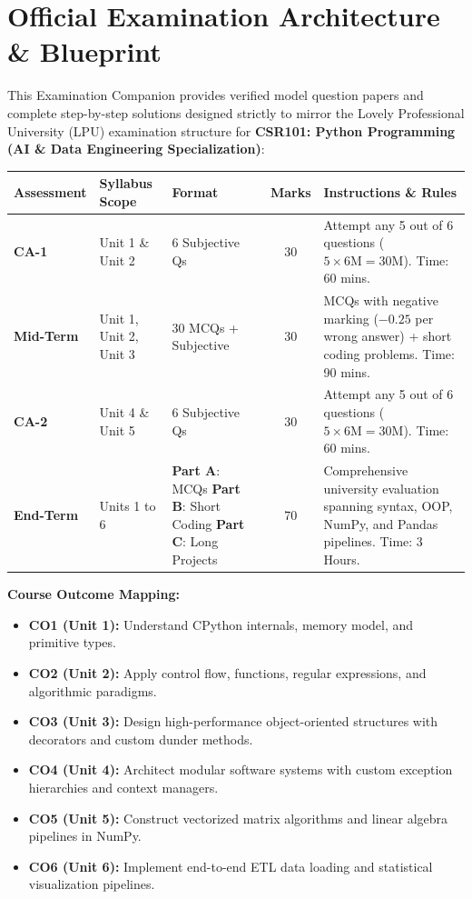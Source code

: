 \chapter*{Official Examination Architecture \& Blueprint}

This Examination Companion provides verified model question papers and complete step-by-step solutions designed strictly to mirror the Lovely Professional University (LPU) examination structure for \textbf{CSR101: Python Programming (AI \& Data Engineering Specialization)}:

\begin{center}
\begin{tabularx}{\textwidth}{l p{3.2cm} p{2.8cm} c X}
\toprule
\textbf{Assessment} & \textbf{Syllabus Scope} & \textbf{Format} & \textbf{Marks} & \textbf{Instructions \& Rules} \\
\midrule
\textbf{CA-1} & Unit 1 \& Unit 2 & 6 Subjective Qs & 30 & Attempt any 5 out of 6 questions ($5 \times 6\text{M} = 30\text{M}$). Time: 60 mins. \\
\addlinespace
\textbf{Mid-Term} & Unit 1, Unit 2, Unit 3 & 30 MCQs + Subjective & 30 & MCQs with negative marking ($-0.25$ per wrong answer) + short coding problems. Time: 90 mins. \\
\addlinespace
\textbf{CA-2} & Unit 4 \& Unit 5 & 6 Subjective Qs & 30 & Attempt any 5 out of 6 questions ($5 \times 6\text{M} = 30\text{M}$). Time: 60 mins. \\
\addlinespace
\textbf{End-Term} & Units 1 to 6 & \textbf{Part A}: MCQs \newline \textbf{Part B}: Short Coding \newline \textbf{Part C}: Long Projects & 70 & Comprehensive university evaluation spanning syntax, OOP, NumPy, and Pandas pipelines. Time: 3 Hours. \\
\bottomrule
\end{tabularx}
\end{center}

\vspace{5mm}
\noindent
\textbf{Course Outcome Mapping:}
\begin{itemize}[leftmargin=1.5em, itemsep=2pt]
    \item \textbf{CO1 (Unit 1):} Understand CPython internals, memory model, and primitive types.
    \item \textbf{CO2 (Unit 2):} Apply control flow, functions, regular expressions, and algorithmic paradigms.
    \item \textbf{CO3 (Unit 3):} Design high-performance object-oriented structures with decorators and custom dunder methods.
    \item \textbf{CO4 (Unit 4):} Architect modular software systems with custom exception hierarchies and context managers.
    \item \textbf{CO5 (Unit 5):} Construct vectorized matrix algorithms and linear algebra pipelines in NumPy.
    \item \textbf{CO6 (Unit 6):} Implement end-to-end ETL data loading and statistical visualization pipelines.
\end{itemize}
\newpage
